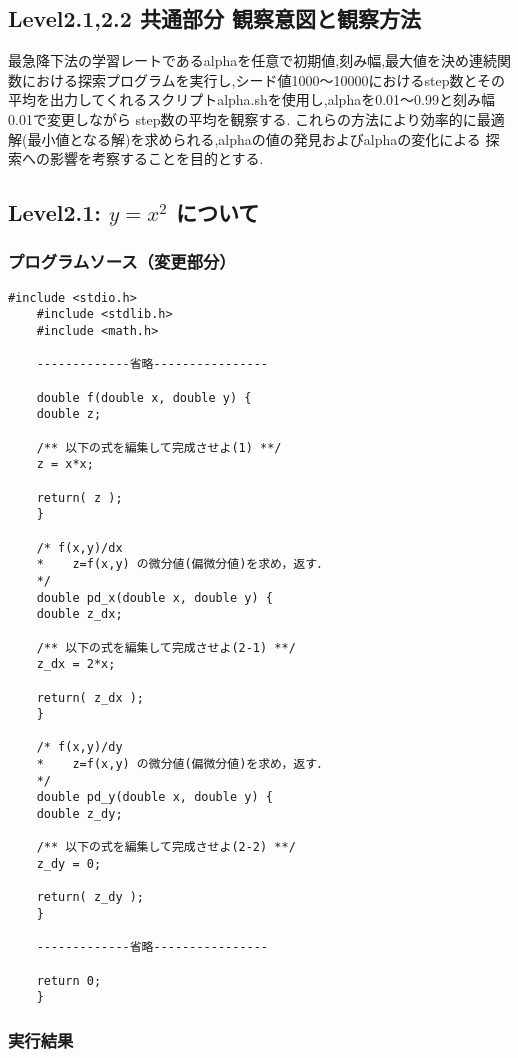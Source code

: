 \subsection{Level2.1,2.2 共通部分 観察意図と観察方法}
最急降下法の学習レートであるalphaを任意で初期値,刻み幅,最大値を決め連続関数における探索プログラムを実行し,シード値1000〜10000におけるstep数とその平均を出力してくれるスクリプトalpha.shを使用し,alphaを0.01〜0.99と刻み幅0.01で変更しながら
step数の平均を観察する.
これらの方法により効率的に最適解(最小値となる解)を求められる,alphaの値の発見およびalphaの変化による
探索への影響を考察することを目的とする.

\subsection{Level2.1: $y=x^2$ について}
\subsubsection{プログラムソース（変更部分）}

	\begin{lstlisting}[caption=探索プログラム,label=ラベル]
	#include <stdio.h>
	#include <stdlib.h>
	#include <math.h>

	-------------省略----------------

	double f(double x, double y) {
  	double z;

  	/** 以下の式を編集して完成させよ(1) **/
  	z = x*x;

  	return( z );
	}

	/* f(x,y)/dx
 	*    z=f(x,y) の微分値(偏微分値)を求め，返す．
 	*/
	double pd_x(double x, double y) {
  	double z_dx;

  	/** 以下の式を編集して完成させよ(2-1) **/
  	z_dx = 2*x;

  	return( z_dx );
	}

	/* f(x,y)/dy
 	*    z=f(x,y) の微分値(偏微分値)を求め，返す．
 	*/
	double pd_y(double x, double y) {
  	double z_dy;

  	/** 以下の式を編集して完成させよ(2-2) **/
  	z_dy = 0;

  	return( z_dy );
	}

	-------------省略----------------

    return 0;
	}
	\end{lstlisting}



\subsubsection{実行結果}

